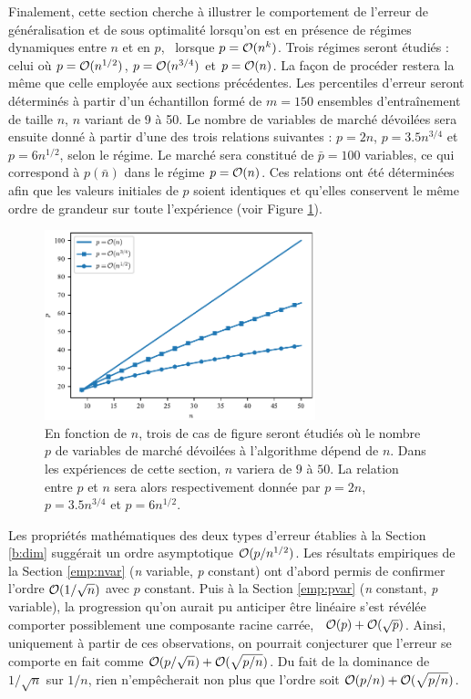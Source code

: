 Finalement, cette section cherche à illustrer le comportement de l'erreur de
généralisation et de sous optimalité lorsqu'on est en présence de régimes dynamiques entre
$n$ et en $p$, \ie\ lorsque $p=\mathcal O(n^k)$. Trois régimes seront étudiés : celui où
$p=\mathcal O(n^{1/2})$, $p=\mathcal O(n^{3/4})$ et $p=\mathcal O(n)$. La façon de procéder restera la
même que celle employée aux sections précédentes. Les percentiles d'erreur seront
déterminés à partir d'un échantillon formé de $m=150$ ensembles d'entraînement de taille
$n$, $n$ variant de 9 à 50. Le nombre de variables de marché dévoilées sera ensuite donné
à partir d'une des trois relations suivantes : $p=2n$, $p=3.5n^{3/4}$ et $p=6n^{1/2}$,
selon le régime. Le marché sera constitué de $\bar p = 100$ variables, ce qui correspond à
$p(\bar n)$ dans le régime $p = \mathcal O(n)$. Ces relations ont été déterminées afin que les
valeurs initiales de $p$ soient identiques et qu'elles conservent le même ordre de
grandeur sur toute l'expérience (voir Figure \ref{fig_np_np}).

\begin{figure}[h]
  \centering
  \includegraphics[width=0.7\textwidth]{../experiments/fig/np_np.pdf}
  \caption{En fonction de $n$, trois de cas de figure seront étudiés où le nombre $p$ de
    variables de marché dévoilées à l'algorithme dépend de $n$. Dans les expériences de
    cette section, $n$ variera de $9$ à $50$. La relation entre $p$ et $n$ sera alors
    respectivement donnée par $p = 2n$, $p=3.5n^{3/4}$ et $p=6n^{1/2}$.}
  \label{fig_np_np}
\end{figure}


Les propriétés mathématiques des deux types d'erreur établies à la Section \ref{b:dim}
suggérait un ordre asymptotique $\mathcal O(p/n^{1/2})$. Les résultats empiriques de la Section
\ref{emp:nvar} (\textit{n} variable, \textit{p} constant) ont d'abord permis de confirmer
l'ordre $\mathcal O(1/\sqrt{n})$ avec $p$ constant. Puis à la Section \ref{emp:pvar}
(\textit{n} constant, \textit{p} variable), la progression qu'on aurait pu anticiper être
linéaire s'est révélée comporter possiblement une composante racine carrée, \ie\
$\mathcal O(p) + \mathcal O(\sqrt{p})$. Ainsi, uniquement à partir de ces observations, on pourrait
conjecturer que l'erreur se comporte en fait comme
$\mathcal O(p/\sqrt{n}) + \mathcal O(\sqrt{p/n})$. Du fait de la dominance de $1/\sqrt{n}$ sur
$1/n$, rien n'empêcherait non plus que l'ordre soit $\mathcal O(p/n) + \mathcal O(\sqrt{p/n})$.


